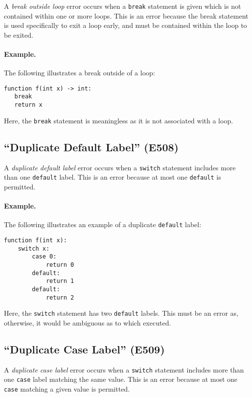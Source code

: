 A {\em break outside loop} error occurs when a \lstinline{break} statement is given which is not contained within one or more loops.  This is an error because the break statement is used specifically to exit a loop early, and must be contained within the loop to be exited.  

\paragraph{Example.}  The following illustrates a break outside of a loop:

\begin{lstlisting}
function f(int x) -> int:
   break
   return x
\end{lstlisting}

Here, the \lstinline{break} statement is meaningless as it is not associated with a loop.

\subsection{``Duplicate Default Label'' (E508)}
A {\em duplicate default label} error occurs when a \lstinline{switch} statement includes more than one \lstinline{default} label.  This is an error because at most one \lstinline{default} is permitted.

\paragraph{Example.}  The following illustrates an example of a duplicate \lstinline{default} label:

\begin{lstlisting}
function f(int x):
    switch x:
        case 0:
            return 0
        default:
            return 1
        default:
            return 2
\end{lstlisting}

Here, the \lstinline{switch} statement has two \lstinline{default} labels.  This must be an error as, otherwise, it would be ambiguous as to which executed.

\subsection{``Duplicate Case Label'' (E509)}
A {\em duplicate case label} error occurs when a \lstinline{switch} statement includes more than one \lstinline{case} label matching the same value.  This is an error because at most one \lstinline{case} matching a given value is permitted.

